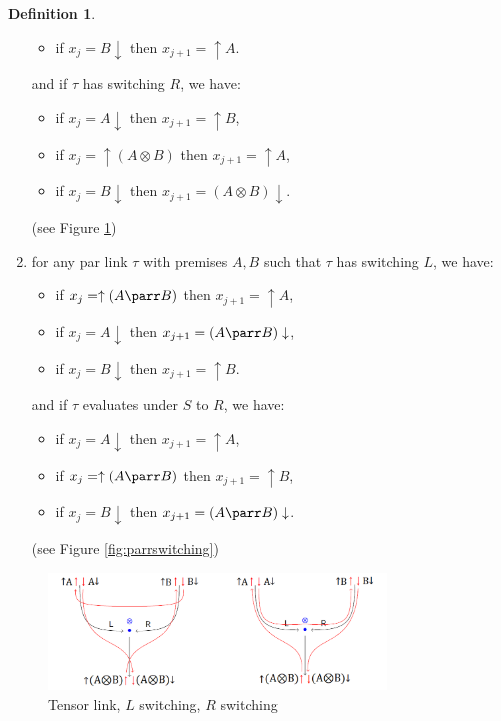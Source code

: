 \documentclass[12pt]{article}
\theoremstyle{plain}
\theoremstyle{definition}
\newtheorem{defn}[thm]{Definition} %
\begin{document}
\begin{defn}
\begin{enumerate}
\begin{itemize}
        \item if $x_j = B \downarrow$ then $x_{j+1} = \uparrow A$.
    \end{itemize}
    and if $\tau$ has switching $R$, we have:
    \begin{itemize}
        \item if $x_j = A \downarrow$ then $x_{j+1} = \uparrow B$,
        \item if $x_j = \uparrow (A \otimes B)$ then $x_{j+1} = \uparrow A$,
        \item if $x_j = B \downarrow$ then $x_{j+1} = (A \otimes B) \downarrow$.
    \end{itemize}
    (see Figure \ref{fig:tensorswitching})
    \item\label{def:trip_right_par} for any par link $\tau$ with premises $A,B$ such that $\tau$ has switching $L$, we have:
    \begin{itemize}
        \item if $x_j = \uparrow (A \parr B)$ then $x_{j+1} = \uparrow A$,
        \item if $x_j = A\downarrow$ then $x_{j+1} = (A \parr B)\downarrow$,
        \item if $x_j = B\downarrow$ then $x_{j+1} = \uparrow B$.
    \end{itemize}
    and if $\tau$ evaluates under $S$ to $R$, we have:
    \begin{itemize}
        \item if $x_j = A\downarrow$ then $x_{j+1} = \uparrow A$,
        \item if $x_j = \uparrow (A\parr B)$ then $x_{j+1} = \uparrow B$,
        \item if $x_j = B\downarrow$ then $x_{j+1} = (A\parr B)\downarrow$.
    \end{itemize}
    (see Figure \ref{fig:parrswitching})
\end{enumerate}
\begin{figure}[h]
    \centering
    \includegraphics[width = 0.8\textwidth]{TensorSwitching.png}
    \caption{Tensor link, $L$ switching, $R$ switching}
    \label{fig:tensorswitching}
\end{figure}

\end{defn}
\end{document}
